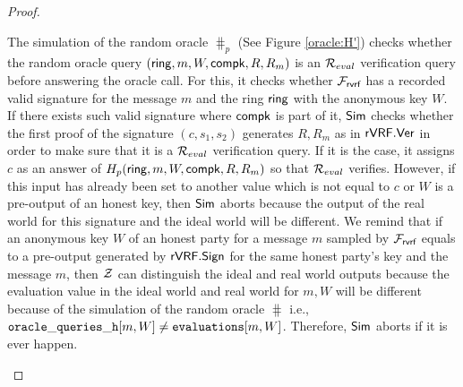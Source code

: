 \begin{proof}
\begin{itemize}
		The simulation of the random oracle $ \hash_p $ (See Figure \ref{oracle:H'}) checks whether the random oracle query $ (\mathsf{ring},m,W,\mathsf{compk},R,R_m) $ is an $ \mathcal{R}_{eval} $ verification query before answering the oracle call. For this, it checks whether $ \mathcal{F}_{\textsf{rvrf}} $ has a recorded valid signature for the message $ m $ and the ring $ \mathsf{ring} $ with the anonymous key $ W $. If there exists such valid signature where $ \mathsf{compk} $ is part of it, $ \mathsf{Sim} $ checks whether the first proof of the signature $ (c,s_1, s_2) $ generates $ R, R_m $ as in $ {\mathsf{rVRF}}.{\mathsf{Ver}} $ in order to make sure that it is a $ \mathcal{R}_{eval} $ verification query. If it is the case, it assigns $ c $ as an answer of $ H_p (\mathsf{ring},m,W,\mathsf{compk},R,R_m) $ so that $ \mathcal{R}_{eval} $ verifies. However, if this input has already been set to another value which is not equal to $ c $ or $ W $ is a pre-output of an honest key, then $ \mathsf{Sim} $ aborts because the output of the real world for this signature and the ideal world will be different.
		We remind that if an anonymous key $ W $ of an honest party  for a message $ m $ sampled by $ \mathcal{F}_{\textsf{rvrf}} $ equals to a pre-output generated by $ {\mathsf{rVRF}}.{\mathsf{Sign}} $  for the same honest party's key and the message $ m $, then $ \mathcal{Z} $ can distinguish the ideal and real world outputs because the evaluation value in the ideal world and real world for $ m,W $ will be different because of the simulation of the random oracle $ \hash $ i.e., $ \mathtt{oracle\_queries\_h}[m,W] \neq \texttt{evaluations}[m,W] $.  Therefore, $ \mathsf{Sim} $ aborts if it is ever happen.
		
		\begin{figure}
			\centering
			
			\noindent{}
\end{figure}
\end{itemize}
\end{proof}
